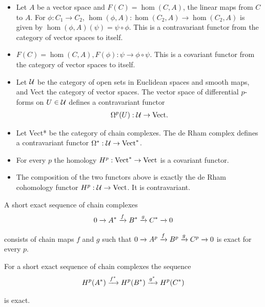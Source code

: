 \begin{itemize}
  \item Let $A$ be a vector space and $F(C) = \hom(C, A)$, the linear maps from
        $C$ to $A$. For $\phi:C_1\to C_2$, $\hom(\phi, A):\hom(C_2, A)\to \hom(C_2,A)$ is
        given by $\hom(\phi, A)(\psi) = \psi\circ\phi$. This is a contravariant functor from the
        category of vector spaces to itself.
  \item $F(C) = \hom(C, A), F(\phi):\psi \to\phi\circ\psi$. This is a covariant functor from the
        category of vector spaces to itself.
  \item Let $\mathcal{U}$ be the category of open sets in Euclidean spaces and smooth maps,
        and Vect the category of vector spaces. The vector space of differential
        $p$-forms on $U\in\mathcal{U}$ defines a contravariant functor
        \begin{align*}
          \Omega^p(U):\mathcal{U}\to \mathrm{Vect}.
        \end{align*}
  \item Let Vect* be the category of chain complexes. The de Rham complex
        defines a contravariant functor $\Omega^*:\mathcal{U}\to\mathrm{Vect}^*$.
  \item For every $p$ the homology $H^p:\mathrm{Vect}^*\to\mathrm{Vect}$ is a covariant functor.
  \item The composition of the two functors above is exactly the de Rham
        cohomology functor $H^p:\mathcal{U}\to\mathrm{Vect}$. It is contravariant.
\end{itemize}

A short exact sequence of chain complexes
\begin{align*}
  0\xrightarrow[]{} A^*\xrightarrow[]{f} B^*\xrightarrow[]{g} C^*\xrightarrow[]{} 0
\end{align*}

consists of chain maps $f$ and $g$ such that $0\xrightarrow[]{}A^p\xrightarrow[]{f}B^p\xrightarrow[]{g}C^p\xrightarrow[]{}0$ is exact
for every $p$.

\begin{lemma}\label{lemma:4-4}
  For a short exact sequence of chain complexes the sequence
  \begin{align*}
    H^p(A^*)\xrightarrow[]{f^*} H^p(B^*)\xrightarrow[]{g^*} H^p(C^*)
  \end{align*}

  is exact.
\end{lemma}

